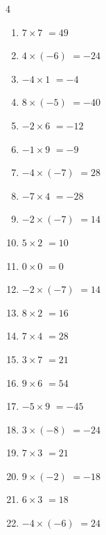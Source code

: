 \begin{multicols}{4}
\begin{enumerate}
  \item $7\times 7$
        $=49$

  \item $4\times (-6)$
        $=-24$

  \item $-4\times 1$
        $=-4$

  \item $8\times (-5)$
        $=-40$

  \item $-2\times 6$
        $=-12$

  \item $-1\times 9$
        $=-9$

\columnbreak %

  \item $-4\times (-7)$
        $=28$

  \item $-7\times 4$
        $=-28$

  \item $-2\times (-7)$
        $=14$

  \item $5\times 2$
        $=10$

  \item $0\times 0$
        $=0$

  \item $-2\times (-7)$
        $=14$

  \item $8\times 2$
        $=16$

  \item $7\times 4$
        $=28$

  \item $3\times 7$
        $=21$

  \item $9\times 6$
        $=54$

  \item $-5\times 9$
        $=-45$

  \item $3\times (-8)$
        $=-24$

  \item $7\times 3$
        $=21$

  \item $9\times (-2)$
        $=-18$

  \item $6\times 3$
        $=18$

  \item $-4\times (-6)$
        $=24$


\end{enumerate}
\end{multicols}
